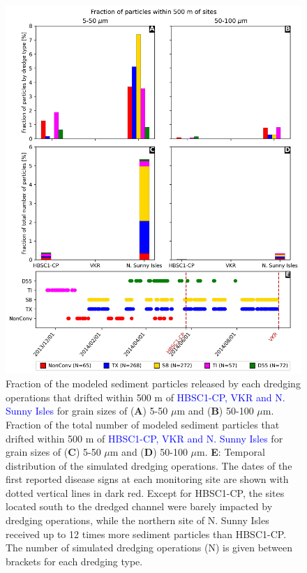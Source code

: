 \documentclass[preprint,12pt,authoryear]{elsarticle}
\newcommand{\modif}[1]{\textcolor{blue}{#1}}
\begin{document}
\begin{figure}
	\centering
	\includegraphics[width=.85\textwidth]{figures/aggregated_stokes4_v3_500m_timeline_new.png}
	\caption{Fraction of the modeled sediment particles released by each dredging operations that drifted within 500 m of \modif{HBSC1-CP, VKR and N. Sunny Isles} for grain sizes of (\textbf{A}) 5-50 $\mu$m  and (\textbf{B}) 50-100 $\mu$m. Fraction of the total number of modeled sediment particles that drifted within 500 m of \modif{HBSC1-CP, VKR and N. Sunny Isles} for grain sizes of (\textbf{C}) 5-50 $\mu$m  and (\textbf{D}) 50-100 $\mu$m. \textbf{E}: Temporal distribution of the simulated dredging operations. The dates of the first reported disease signs at each monitoring site are shown with dotted vertical lines in dark red. Except for HBSC1-CP, the sites located south to the dredged channel were barely impacted by dredging operations, while the northern site of N. Sunny Isles received up to 12 times more sediment particles than HBSC1-CP. The number of simulated dredging operations (N) is given between brackets for each dredging type.}\label{fig:onset_bar}
\end{figure}
\end{document}
